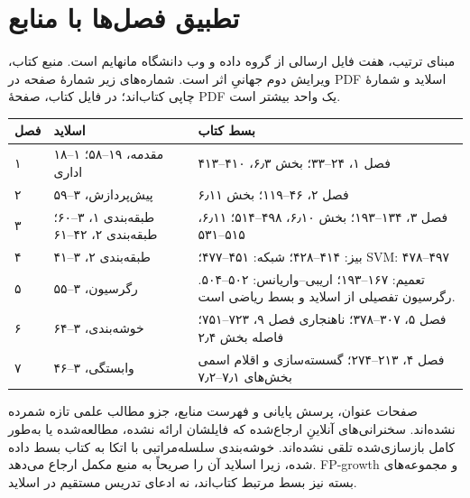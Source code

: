 \documentclass[12pt,a4paper,oneside]{report}
\begin{document}
\section{تطبیق فصل‌ها با منابع}
مبنای ترتیب، هفت فایل  ارسالی از گروه داده و وب دانشگاه مانهایم است. منبع کتاب، ویرایش دوم جهانیِ  اثر  است. شماره‌های زیر شمارهٔ صفحه در PDF اسلاید و شمارهٔ چاپی کتاب‌اند؛ در فایل کتاب، صفحهٔ PDF یک واحد بیشتر است.
\begin{longtable}{p{20mm}p{51mm}p{70mm}}
\toprule
فصل & اسلاید & بسط کتاب\\\midrule\endhead
۱ & مقدمه، ۱۹–۵۸؛ ۱–۱۸ اداری & فصل ۱، ۲۴–۳۳؛ بخش ۶٫۳، ۴۱۰–۴۱۳\\
۲ & پیش‌پردازش، ۳–۵۹ & فصل ۲، ۴۶–۱۱۹؛ بخش ۶٫۱۱\\
۳ & طبقه‌بندی ۱، ۳–۶۰؛ طبقه‌بندی ۲، ۴۲–۶۱ & فصل ۳، ۱۳۴–۱۹۳؛ بخش ۶٫۱۰، ۴۹۸–۵۱۴؛ ۶٫۱۱، ۵۱۵–۵۳۱\\
۴ & طبقه‌بندی ۲، ۳–۴۱ & بیز: ۴۱۴–۴۲۸؛ شبکه: ۴۵۱–۴۷۷؛ SVM: ۴۷۸–۴۹۷\\
۵ & رگرسیون، ۳–۵۵ & تعمیم: ۱۶۷–۱۹۳؛ اریبی–واریانس: ۵۰۲–۵۰۴. رگرسیون تفصیلی از اسلاید و بسط ریاضی است.\\
۶ & خوشه‌بندی، ۳–۶۴ & فصل ۵، ۳۰۷–۳۷۸؛ ناهنجاری فصل ۹، ۷۲۳–۷۵۱؛ فاصله بخش ۲٫۴\\
۷ & وابستگی، ۳–۴۶ & فصل ۴، ۲۱۳–۲۷۴؛ گسسته‌سازی و اقلام اسمی بخش‌های ۷٫۱–۷٫۲\\
\bottomrule
\end{longtable}
صفحات عنوان، پرسش پایانی و فهرست منابع، جزو مطالب علمی تازه شمرده نشده‌اند. سخنرانی‌های آنلاینِ ارجاع‌شده که فایلشان ارائه نشده، مطالعه‌شده یا به‌طور کامل بازسازی‌شده تلقی نشده‌اند. خوشه‌بندی سلسله‌مراتبی با اتکا به کتاب بسط داده شده، زیرا اسلاید آن را صریحاً به منبع مکمل ارجاع می‌دهد. FP-growth و مجموعه‌های بسته نیز بسط مرتبط کتاب‌اند، نه ادعای تدریس مستقیم در اسلاید.
\end{document}
